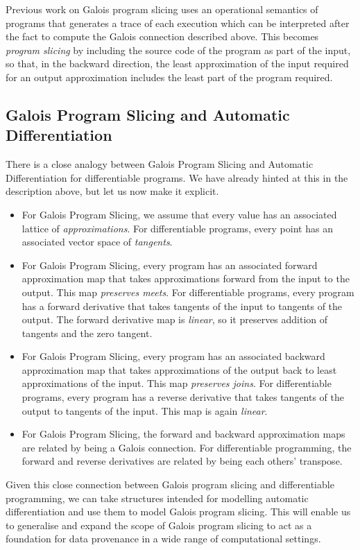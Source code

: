 \begin{example}
\end{example}

Previous work on Galois program slicing uses an operational semantics of programs that generates a trace of each execution which can be interpreted after the fact to compute the Galois connection described above. This becomes {\em program slicing} by including the source code of the program as part of the input, so that, in the backward direction, the least approximation of the input required for an output approximation includes the least part of the program required.

\subsection{Galois Program Slicing and Automatic Differentiation}

There is a close analogy between Galois Program Slicing and Automatic Differentiation for differentiable programs. We have already hinted at this in the description above, but let us now make it explicit.

\begin{itemize}
\item For Galois Program Slicing, we assume that every value has an associated lattice of {\em approximations}. For differentiable programs, every point has an associated vector space of {\em tangents}.
\item For Galois Program Slicing, every program has an associated forward approximation map that takes approximations forward from the input to the output. This map {\em preserves meets}. For differentiable programs, every program has a forward derivative that takes tangents of the input to tangents of the output. The forward derivative map is {\em linear}, so it preserves addition of tangents and the zero tangent.
\item For Galois Program Slicing, every program has an associated backward approximation map that takes approximations of the output back to least approximations of the input. This map {\em preserves joins}. For differentiable programs, every program has a reverse derivative that takes tangents of the output to tangents of the input. This map is again {\em linear}.
\item For Galois Program Slicing, the forward and backward approximation maps are related by being a Galois connection. For differentiable programming, the forward and reverse derivatives are related by being each others' transpose.
\end{itemize}

Given this close connection between Galois program slicing and differentiable programming, we can take structures intended for modelling automatic differentiation and use them to model Galois program slicing. This will enable us to generalise and expand the scope of Galois program slicing to act as a foundation for data provenance in a wide range of computational settings.

